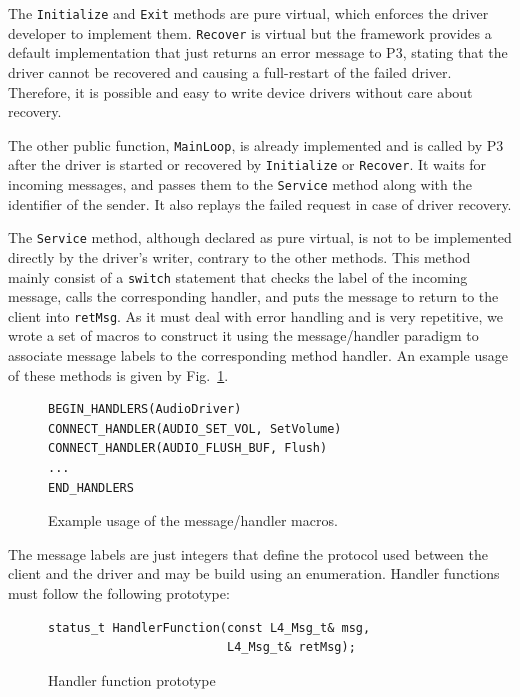 \documentclass[times, 10pt, twocolumn]{article}
\begin{document}
The \texttt{Initialize} and \texttt{Exit} methods are pure virtual, which enforces the driver developer to implement them. \texttt{Recover} is virtual but the framework provides a default implementation that just returns an error message to P3, stating that the driver cannot be recovered and causing a full-restart of the failed driver. Therefore, it is possible and easy to write device drivers without care about recovery.

The other public function, \texttt{MainLoop}, is already implemented and is called by P3 after the driver is started or recovered by \texttt{Initialize} or \texttt{Recover}. It waits for incoming messages, and passes them to the \texttt{Service} method along with the identifier of the sender. It also replays the failed request in case of driver recovery.

The \texttt{Service} method, although declared as pure virtual, is not to be implemented directly by the driver's writer, contrary to the other methods. This method mainly consist of a \texttt{switch} statement that checks the label of the incoming message, calls the corresponding handler, and puts the message to return to the client into \texttt{retMsg}. As it must deal with error handling and is very repetitive, we wrote a set of macros to construct it using the message/handler paradigm to associate message labels to the corresponding method handler. An example usage of these methods is given by Fig.~\ref{fig:connectors}.

\begin{figure}[ht]
\centering
\begin{screen}
\scriptsize{
\begin{verbatim}
BEGIN_HANDLERS(AudioDriver)
CONNECT_HANDLER(AUDIO_SET_VOL, SetVolume)
CONNECT_HANDLER(AUDIO_FLUSH_BUF, Flush)
...
END_HANDLERS
\end{verbatim}
}
\end{screen}
\caption{Example usage of the message/handler macros.}
\label{fig:connectors}
\end{figure}

The message labels are just integers that define the protocol used between the client and the driver and may be build using an enumeration. Handler functions must follow the following prototype:

\begin{figure}[ht]
\centering
\begin{screen}
\scriptsize{
\begin{verbatim}
status_t HandlerFunction(const L4_Msg_t& msg,
                         L4_Msg_t& retMsg);
\end{verbatim}
}
\end{screen}
\caption{Handler function prototype}
\label{fig:handler}
\end{figure}
\end{document}
